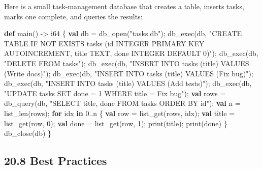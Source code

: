 \documentclass[
  english,
]{book}
\newenvironment{Shaded}{\begin{snugshade}}{\end{snugshade}}
\newcommand{\ControlFlowTok}[1]{\textcolor[rgb]{0.77,0.53,0.75}{\textbf{#1}}}
\newcommand{\DataTypeTok}[1]{\textcolor[rgb]{0.31,0.79,0.69}{#1}}
\newcommand{\DecValTok}[1]{\textcolor[rgb]{0.71,0.81,0.66}{#1}}
\newcommand{\FunctionTok}[1]{\textcolor[rgb]{0.86,0.86,0.67}{#1}}
\newcommand{\KeywordTok}[1]{\textcolor[rgb]{0.34,0.61,0.84}{\textbf{#1}}}
\newcommand{\NormalTok}[1]{\textcolor[rgb]{0.83,0.83,0.83}{#1}}
\newcommand{\OperatorTok}[1]{\textcolor[rgb]{0.83,0.83,0.83}{#1}}
\newcommand{\StringTok}[1]{\textcolor[rgb]{0.81,0.57,0.47}{#1}}
\begin{document}
Here is a small task-management database that creates a table, inserts
tasks, marks one complete, and queries the results:

\begin{Shaded}
\begin{Highlighting}[]
\KeywordTok{def}\NormalTok{ main() }\OperatorTok{{-}\textgreater{}} \DataTypeTok{i64}\NormalTok{ \{}
    \KeywordTok{val}\NormalTok{ db }\OperatorTok{=}\NormalTok{ db\_open(}\StringTok{"tasks.db"}\NormalTok{);}
\NormalTok{    db\_exec(db, }\StringTok{"CREATE TABLE IF NOT EXISTS tasks (id INTEGER PRIMARY KEY AUTOINCREMENT, title TEXT, done INTEGER DEFAULT 0)"}\NormalTok{);}
\NormalTok{    db\_exec(db, }\StringTok{"DELETE FROM tasks"}\NormalTok{);}
\NormalTok{    db\_exec(db, }\StringTok{"INSERT INTO tasks (title) VALUES (\textquotesingle{}Write docs\textquotesingle{})"}\NormalTok{);}
\NormalTok{    db\_exec(db, }\StringTok{"INSERT INTO tasks (title) VALUES (\textquotesingle{}Fix bug\textquotesingle{})"}\NormalTok{);}
\NormalTok{    db\_exec(db, }\StringTok{"INSERT INTO tasks (title) VALUES (\textquotesingle{}Add tests\textquotesingle{})"}\NormalTok{);}
\NormalTok{    db\_exec(db, }\StringTok{"UPDATE tasks SET done = 1 WHERE title = \textquotesingle{}Fix bug\textquotesingle{}"}\NormalTok{);}
    \KeywordTok{val}\NormalTok{ rows }\OperatorTok{=}\NormalTok{ db\_query(db, }\StringTok{"SELECT title, done FROM tasks ORDER BY id"}\NormalTok{);}
    \KeywordTok{val}\NormalTok{ n }\OperatorTok{=} \FunctionTok{list\_len}\NormalTok{(rows);}
    \ControlFlowTok{for}\NormalTok{ idx }\ControlFlowTok{in} \DecValTok{0}\OperatorTok{..}\NormalTok{n \{}
        \KeywordTok{val}\NormalTok{ row }\OperatorTok{=} \FunctionTok{list\_get}\NormalTok{(rows, idx);}
        \KeywordTok{val}\NormalTok{ title }\OperatorTok{=} \FunctionTok{list\_get}\NormalTok{(row, }\DecValTok{0}\NormalTok{);}
        \KeywordTok{val}\NormalTok{ done }\OperatorTok{=} \FunctionTok{list\_get}\NormalTok{(row, }\DecValTok{1}\NormalTok{);}
        \FunctionTok{print}\NormalTok{(title);}
        \FunctionTok{print}\NormalTok{(done)}
\NormalTok{    \}}
\NormalTok{    db\_close(db)}
\NormalTok{\}}
\end{Highlighting}
\end{Shaded}

\subsection{20.8 Best Practices}\label{best-practices}
\end{document}
